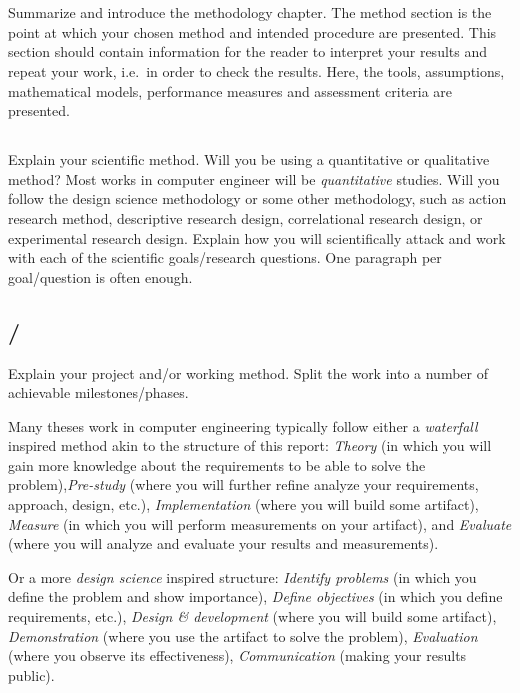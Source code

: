 \section{}\label{sec:method}
Summarize and introduce the methodology chapter. The method section is the point at which your
chosen method and intended procedure are presented. This section should contain information for the
reader to interpret your results and repeat your work, i.e.\ in order to check the results. Here, the
tools, assumptions, mathematical models, performance measures and assessment criteria are presented.

\subsection{}\label{subsec:scientificmethod}
Explain your scientific method. Will you be using a quantitative or qualitative method? Most works
in computer engineer will be \emph{quantitative} studies. Will you follow the design science
methodology or some other methodology, such as action research method, descriptive research design,
correlational research design, or experimental research design.  Explain how you will scientifically
attack and work with each of the scientific goals/research questions. One paragraph per
goal/question is often enough.

\subsection{/}\label{subsec:projectmethod}
Explain your project and/or working method. Split the work into a number of achievable
milestones/phases.

Many theses work in computer engineering typically follow either a \emph{waterfall} inspired method
akin to the structure of this report: \emph{Theory} (in which you will gain more knowledge about the
requirements to be able to solve the problem),\emph{Pre-study} (where you will further refine
analyze your requirements, approach, design, etc.), \emph{Implementation} (where you will build some
artifact), \emph{Measure} (in which you will perform measurements on your artifact), and
\emph{Evaluate} (where you will analyze and evaluate your results and measurements). 

Or a more \emph{design science} inspired structure: \emph{Identify problems} (in which you define
the problem and show importance), \emph{Define objectives} (in which you define requirements, etc.),
\emph{Design & development} (where you will build some artifact), \emph{Demonstration} (where you
use the artifact to solve the problem), \emph{Evaluation} (where you observe its effectiveness),
\emph{Communication} (making your results public). 

